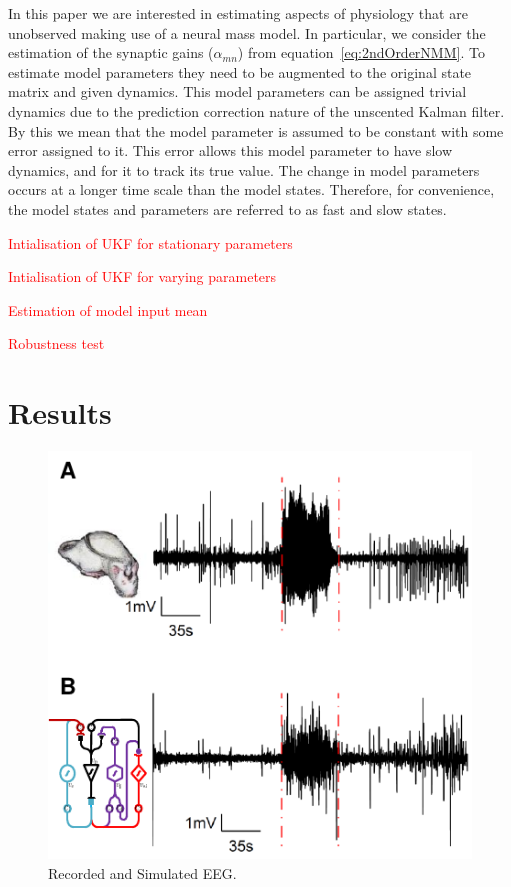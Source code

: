 \documentclass{article}%
\newcommand\red{\textcolor{red}}
\begin{document}

In this paper we are interested in estimating aspects of physiology that are unobserved making use of a neural mass model. In particular, we consider the estimation of the synaptic gains ($\alpha_{mn}$) from equation~\ref{eq:2ndOrderNMM}. To estimate model parameters they need to be augmented to the original state matrix and given dynamics. This model parameters can be assigned trivial dynamics due to the prediction correction nature of the unscented Kalman filter. By this we mean that the model parameter is assumed to be constant with some error assigned to it. This error allows this model parameter to have slow dynamics, and for it to track its true value. The change in model parameters occurs at a longer time scale than the model states. Therefore, for convenience, the model states and parameters are referred to as fast and slow states. 

\red{Intialisation of UKF for stationary parameters}

\red{Intialisation of UKF for varying parameters}

\red{Estimation of model input mean}

\red{Robustness test}

\section{Results}

\begin{figure}
 	\centering
 		\includegraphics{fig/EEG.pdf}
 	\caption{Recorded and Simulated EEG.}
 	\label{fig: EEG}
 \end{figure}
\end{document}
